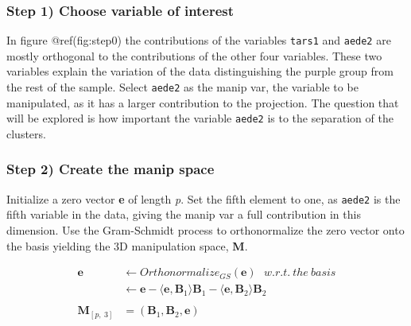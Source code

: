 \begin{Schunk}
\end{Schunk}

\hypertarget{step-1-choose-variable-of-interest}{%
\subsubsection{Step 1) Choose variable of interest}\label{step-1-choose-variable-of-interest}}

In figure @ref(fig:step0) the contributions of the variables \texttt{tars1} and \texttt{aede2} are mostly orthogonal to the contributions of the other four variables. These two variables explain the variation of the data distinguishing the purple group from the rest of the sample. Select \texttt{aede2} as the manip var, the variable to be manipulated, as it has a larger contribution to the projection. The question that will be explored is how important the variable \texttt{aede2} is to the separation of the clusters.

\hypertarget{step-2-create-the-manip-space}{%
\subsubsection{Step 2) Create the manip space}\label{step-2-create-the-manip-space}}

Initialize a zero vector \textbf{e} of length \emph{p}. Set the fifth element to one, as \texttt{aede2} is the fifth variable in the data, giving the manip var a full contribution in this dimension. Use the Gram-Schmidt process to orthonormalize the zero vector onto the basis yielding the 3D manipulation space, \textbf{M}.

\begin{align*}
  \textbf{e} &\leftarrow Orthonormalize_{GS}(\textbf{e}) ~~~ w.r.t.~the~basis \\
  &\leftarrow \textbf{e} - \langle \textbf{e},\textbf{B}_1 \rangle \textbf{B}_1 - \langle \textbf{e}, \textbf{B}_2 \rangle \textbf{B}_2 \\
  \\
  \textbf{M}_{[p,~3]} &= (\textbf{B}_1,\textbf{B}_2,\textbf{e})
\end{align*}

